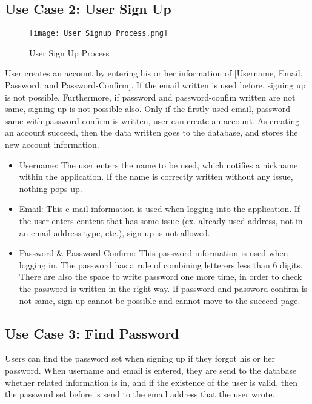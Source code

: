 \documentclass[conference]{IEEEtran}
\begin{document}
\subsection{Use Case 2: User Sign Up}
    \begin{figure}[htbp]
    \centerline{\texttt{[image: User Signup Process.png]}}
    \label{fig}
    \caption{User Sign Up Process}
    \end{figure}
User creates an account by entering his or her information of [Username, Email, Password, and Password-Confirm]. If the email written is used before, signing up is not possible. Furthermore, if password and password-confim written are not same, signing up is not possible also. Only if the firstly-used email, password same with password-confirm is written, user can create an account. As creating an account succeed, then the data written goes to the database, and stores the new account information.\\
\begin{itemize}
    \item Username: The user enters the name to be used, which notifies a nickname within the application. If the name is correctly written without any issue, nothing pops up.\\
    \item Email: This e-mail information is used when logging into the application. If the user enters content that has some issue (ex. already used address, not in an email address type, etc.), sign up is not allowed.\\
    \item Password & Password-Confirm: This password information is used when logging in. The password has a rule of combining letterers less than 6 digits. There are also the space to write password one more time, in order to check the password is written in the right way. If password and password-confirm is not same, sign up cannot be possible and cannot move to the succeed page.\\
\end{itemize}
    
\subsection{Use Case 3: Find Password}
Users can find the password set when signing up if they forgot his or her password. When username and email is entered, they are send to the database whether related information is in, and if the existence of the user is valid, then the password set before is send to the email address that the user wrote.\\
\end{document}
